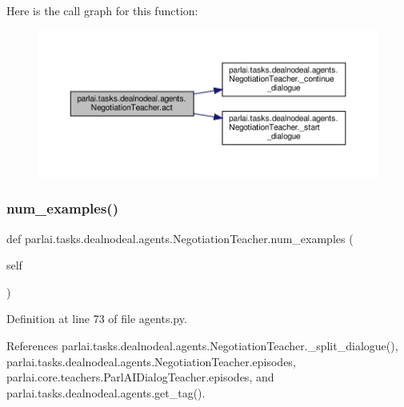 Here is the call graph for this function\+:
\nopagebreak
\begin{figure}[H]
\begin{center}
\leavevmode
\includegraphics[width=350pt]{classparlai_1_1tasks_1_1dealnodeal_1_1agents_1_1NegotiationTeacher_a840acd160a3c71edd83a4e6d227dbd1f_cgraph}
\end{center}
\end{figure}
\mbox{\label{classparlai_1_1tasks_1_1dealnodeal_1_1agents_1_1NegotiationTeacher_a87d200e80614ec6ac4b7611d698f22f5}} 
\subsubsection{\texorpdfstring{num\+\_\+examples()}{num\_examples()}}
{\footnotesize\ttfamily def parlai.\+tasks.\+dealnodeal.\+agents.\+Negotiation\+Teacher.\+num\+\_\+examples (\begin{DoxyParamCaption}\item[{}]{self }\end{DoxyParamCaption})}



Definition at line 73 of file agents.\+py.



References parlai.\+tasks.\+dealnodeal.\+agents.\+Negotiation\+Teacher.\+\_\+split\+\_\+dialogue(), parlai.\+tasks.\+dealnodeal.\+agents.\+Negotiation\+Teacher.\+episodes, parlai.\+core.\+teachers.\+Parl\+A\+I\+Dialog\+Teacher.\+episodes, and parlai.\+tasks.\+dealnodeal.\+agents.\+get\+\_\+tag().



